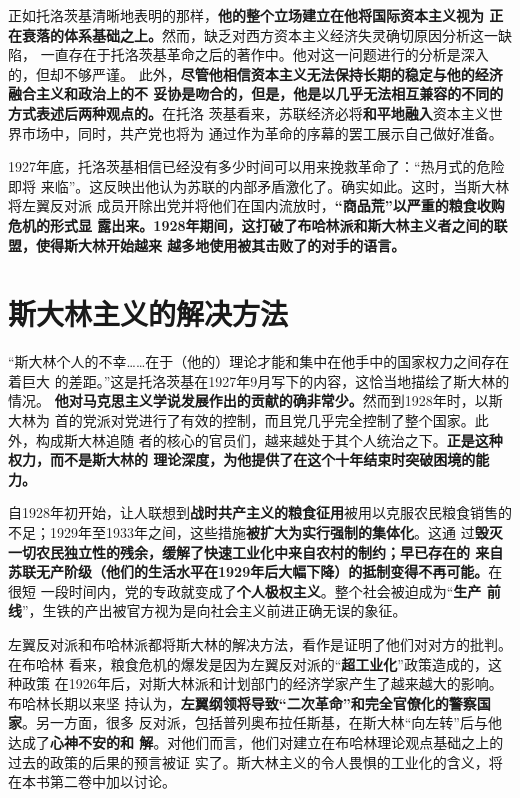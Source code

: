 正如托洛茨基清晰地表明的那样，\textbf{他的整个立场建立在他将国际资本主义视为
正在衰落的体系基础之上。}然而，缺乏对西方资本主义经济失灵确切原因分析这一缺陷，
一直存在于托洛茨基革命之后的著作中。他对这一问题进行的分析是深入的，但却不够严谨。
此外，\textbf{尽管他相信资本主义无法保持长期的稳定与他的经济融合主义和政治上的不
妥协是吻合的，但是，他是以几乎无法相互兼容的不同的方式表述后两种观点的。}在托洛
茨基看来，苏联经济必将\textbf{和平地融入}资本主义世界市场中，同时，共产党也将为
通过作为革命的序幕的罢工展示自己做好准备。

1927年底，托洛茨基相信已经没有多少时间可以用来挽救革命了：“热月式的危险即将
来临”。这反映出他认为苏联的内部矛盾激化了。确实如此。这时，当斯大林将左翼反对派
成员开除出党并将他们在国内流放时，\textbf{“商品荒”以严重的粮食收购危机的形式显
露出来。1928年期间，这打破了布哈林派和斯大林主义者之间的联盟，使得斯大林开始越来
越多地使用被其击败了的对手的语言。}

\section{斯大林主义的解决方法}

“斯大林个人的不幸……在于（他的）理论才能和集中在他手中的国家权力之间存在着巨大
的差距。”这是托洛茨基在1927年9月写下的内容，这恰当地描绘了斯大林的情况。
\textbf{他对马克思主义学说发展作出的贡献的确非常少。}然而到1928年时，以斯大林为
首的党派对党进行了有效的控制，而且党几乎完全控制了整个国家。此外，构成斯大林追随
者的核心的官员们，越来越处于其个人统治之下。\textbf{正是这种权力，而不是斯大林的
理论深度，为他提供了在这个十年结束时突破困境的能力。}

自1928年初开始，让人联想到\textbf{战时共产主义的粮食征用}被用以克服农民粮食销售的
不足；1929年至1933年之间，这些措施\textbf{被扩大为实行强制的集体化}。这通
过\textbf{毁灭一切农民独立性的残余，缓解了快速工业化中来自农村的制约；早已存在的
  来自苏联无产阶级（他们的生活水平在1929年后大幅下降）的抵制变得不再可能。}在很短
一段时间内，党的专政就变成了\textbf{个人极权主义}。整个社会被迫成为“\textbf{生产
  前线}”，生铁的产出被官方视为是向社会主义前进正确无误的象征。

左翼反对派和布哈林派都将斯大林的解决方法，看作是证明了他们对对方的批判。在布哈林
看来，粮食危机的爆发是因为左翼反对派的“\textbf{超工业化}”政策造成的，这种政策
在1926年后，对斯大林派和计划部门的经济学家产生了越来越大的影响。布哈林长期以来坚
持认为，\textbf{左翼纲领将导致“二次革命”和完全官僚化的警察国家}。另一方面，很多
反对派，包括普列奥布拉任斯基，在斯大林“向左转”后与他达成了\textbf{心神不安的和
  解}。对他们而言，他们对建立在布哈林理论观点基础之上的过去的政策的后果的预言被证
实了。斯大林主义的令人畏惧的工业化的含义，将在本书第二卷中加以讨论。

